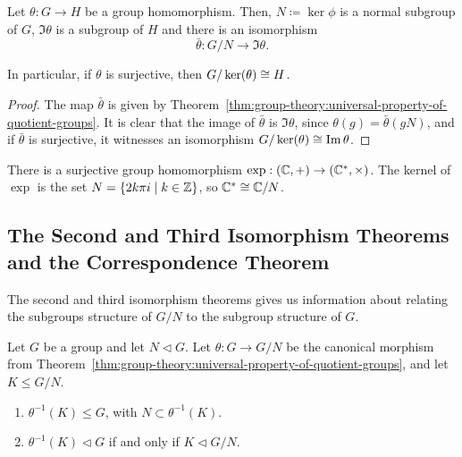 \begin{theorem}
  \label{thm:group-theory:first-isomorphism-theorem}
  Let \(\theta : G \to H\) be a group homomorphism.
  Then, \(N \coloneqq \ker\phi\) is a normal subgroup of \(G\), \(\Im \theta\) is a subgroup of \(H\) and there is an isomorphism
  \[\bar \theta : G / N \to \Im \theta.\]

  In particular, if \(\theta\) is surjective, then \(G / \ker(\theta) \cong H\).
\end{theorem}

\begin{proof}
  The map \(\bar \theta\) is given by Theorem~\ref{thm:group-theory:universal-property-of-quotient-groups}.
  It is clear that the image of \(\bar\theta\) is \(\Im \theta\), since \(\theta(g) = \bar \theta(gN)\), and if \(\bar\theta\) is surjective, it witnesses an isomorphism \(G/\ker(\theta) \cong \Im \theta\).
\end{proof}

\begin{example}
  There is a surjective group homomorphism \(\exp : (\mathbb{C}, +) \to (\mathbb{C}^{*}, \times)\).
  The kernel of \(\exp\) is the set \(N = \{2k\pi i \mid k \in \mathbb{Z}\}\), so \(\mathbb{C}^{*} \cong \mathbb{C}/N\).
\end{example}


\subsection{The Second and Third Isomorphism Theorems and the Correspondence Theorem}\label{sec:second-and-third-isomorphism-theorems-and-correspondence-theorem}

The second and third isomorphism theorems gives us information about relating the subgroups structure of \(G /N\) to the subgroup structure of \(G\).

\begin{proposition}\label{prp:group-theory:preimage-of-subgroups-of-G/N}
  Let \(G\) be a group and let \(N \triangleleft G\).
  Let \(\theta: G \to G/N\) be the canonical morphism from Theorem~\ref{thm:group-theory:universal-property-of-quotient-groups}, and let \(K \leq G / N\).

  \begin{enumerate}
  \item
    \(\theta^{-1}(K) \leq G\), with \(N \subset \theta^{-1}(K)\).
  \item
    \(\theta^{-1}(K) \triangleleft G\) if and only if \(K \triangleleft G/N\).
  \end{enumerate}
\end{proposition}

